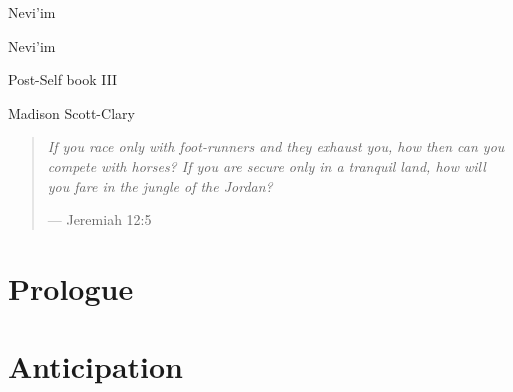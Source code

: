 \documentclass[11pt]{memoir}
\begin{document}
  \frontmatter

  \thispagestyle{empty}
  \null
  \vfill
  \begin{flushright}
    \DisplayFont Nevi'im
  \end{flushright}
  \vfill
  \cleardoublepage

  \pagestyle{plain}

  \doublespacing

  \begin{flushright}
    \null
    \vfill
    {\Huge\DisplayFont Nevi'im}

    {\DisplayFont Post-Self book III}

    \vfill

    {\Large\DisplayFont Madison Scott-Clary}
  \end{flushright}
  \thispagestyle{empty}

  \newpage

  

  \newpage
  \null
  \cleardoublepage



  \mainmatter

  \pagestyle{ourbook}

  \cleardoublepage
  \null
  \thispagestyle{empty}
  \vfill
  \begin{quote}
    \small
    \emph{If you race only with foot-runners and they exhaust you, how then can you compete with horses? If you are secure only in a tranquil land, how will you fare in the jungle of the Jordan?}

    --- Jeremiah 12:5
  \end{quote}
  \vfill

  \part*{Prologue}
  

  \part{Anticipation}
  
  
  
  
  
  
  
  
  
  
  
  
  
  
  
\end{document}
